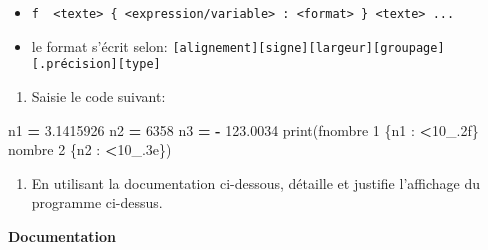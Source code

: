 \documentclass[
]{book}
\newenvironment{Shaded}{\begin{snugshade}}{\end{snugshade}}
\newcommand{\BuiltInTok}[1]{#1}
\newcommand{\DecValTok}[1]{\textcolor[rgb]{0.00,0.00,0.81}{#1}}
\newcommand{\FloatTok}[1]{\textcolor[rgb]{0.00,0.00,0.81}{#1}}
\newcommand{\NormalTok}[1]{#1}
\newcommand{\OperatorTok}[1]{\textcolor[rgb]{0.81,0.36,0.00}{\textbf{#1}}}
\newcommand{\SpecialCharTok}[1]{\textcolor[rgb]{0.00,0.00,0.00}{#1}}
\newcommand{\SpecialStringTok}[1]{\textcolor[rgb]{0.31,0.60,0.02}{#1}}
\providecommand{\tightlist}{%
  \setlength{\itemsep}{0pt}\setlength{\parskip}{0pt}}
\def\tightlist{}
\begin{document}
\begin{itemize}
\tightlist
\item
  \texttt{f\ \textquotesingle{}\ \textless{}texte\textgreater{}\ \{\ \textless{}expression/variable\textgreater{}\ :\ \textless{}format\textgreater{}\ \}\ \textless{}texte\textgreater{}\ ...\ \textquotesingle{}}
\item
  le format s'écrit selon: \texttt{{[}alignement{]}{[}signe{]}{[}largeur{]}{[}groupage{]}{[}.précision{]}{[}type{]}}
\end{itemize}

\begin{enumerate}
\def\labelenumi{\arabic{enumi}.}
\tightlist
\item
  Saisie le code suivant:
\end{enumerate}

\begin{Shaded}
\begin{Highlighting}[]
\NormalTok{n1 }\OperatorTok{=} \FloatTok{3.1415926}
\NormalTok{n2 }\OperatorTok{=} \DecValTok{6358}
\NormalTok{n3 }\OperatorTok{=} \OperatorTok{{-}} \FloatTok{123.0034}
\BuiltInTok{print}\NormalTok{(}\SpecialStringTok{f\textquotesingle{}nombre 1 }\SpecialCharTok{\{n1} \SpecialCharTok{:} \OperatorTok{\textless{}}\DecValTok{10}\SpecialCharTok{\_}\FloatTok{.2}\SpecialCharTok{f\}}\SpecialStringTok{ nombre 2 }\SpecialCharTok{\{n2} \SpecialCharTok{:} \OperatorTok{\textless{}}\DecValTok{10}\SpecialCharTok{\_}\FloatTok{.3}\SpecialCharTok{e\}}\SpecialStringTok{\textquotesingle{}}\NormalTok{)}
\end{Highlighting}
\end{Shaded}

\begin{enumerate}
\def\labelenumi{\arabic{enumi}.}
\setcounter{enumi}{1}
\tightlist
\item
  En utilisant la documentation ci-dessous, détaille et justifie l'affichage du programme ci-dessus.
\end{enumerate}

\textbf{Documentation}
\end{document}
